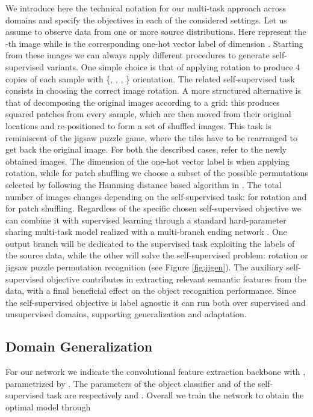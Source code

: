 We introduce here the technical notation for our multi-task approach across domains and specify the objectives in each of the considered settings. 
Let us assume to observe data  from one or more source distributions. 
Here  represent the -th image while 
 is the corresponding one-hot vector label of dimension .
Starting from these images we can always apply different procedures to generate self-supervised variants. One simple choice is that of applying rotation to produce 4 copies of each sample with \{, , , \} orientation. The related self-supervised task consists in choosing the correct image rotation. 
A more structured alternative is that of decomposing the original images according to a  grid: this produces  squared patches from every sample, which are then moved from their original locations and re-positioned to form a set of  shuffled images. {This task is reminiscent of the jigsaw puzzle game}, where the tiles have to be rearranged to get back the original image.
For both the described cases,   refer to the newly obtained images. The dimension of the one-hot vector label  is  when applying rotation, while for patch shuffling we choose a subset  of the  possible permutations selected by following the Hamming distance based algorithm in \cite{NorooziF16}. The total number of images changes depending on the self-supervised task:   for rotation and   for patch shuffling.
Regardless of the specific chosen self-supervised objective we can combine it with supervised learning through a 
standard hard-parameter sharing 
multi-task model realized with a multi-branch ending network  \cite{Caruana:1997}. One output branch will be dedicated to the supervised task exploiting the labels of the source data, while the other will solve the self-supervised problem: rotation or jigsaw puzzle permutation recognition (see Figure \ref{fig:jigen}). 
{The auxiliary self-supervised objective contributes in extracting relevant semantic features from the data, with a final beneficial effect on the object recognition performance. 
Since the self-supervised objective is label agnostic it can run both over supervised and unsupervised domains, supporting generalization and adaptation.
}


\subsection{Domain Generalization}
For our network we indicate the convolutional feature extraction backbone with , parametrized by . The parameters of the object classifier  and of the self-supervised task  are respectively  and . Overall we train the network to obtain the optimal model through \vspace{-3mm}

